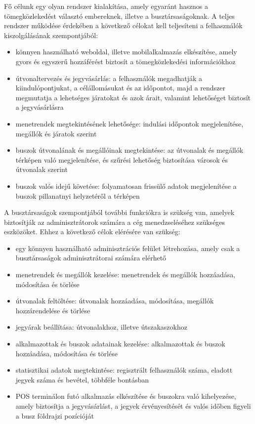 Fő célunk egy olyan rendszer kialakítása, amely egyaránt hasznos a tömegközlekedést választó embereknek, illetve a busztársaságoknak. A teljes rendszer működése érdekében a következő célokat kell teljesíteni a felhasználók kiszolgálásának szempontjából:

\begin{itemize}
  \item könnyen használható weboldal, illetve mobilalkalmazás elkészítése, amely gyors és egyszerű hozzáférést biztosít a tömegközlekedési információkhoz
  \item útvonaltervezés és jegyvásárlás: a felhasználók megadhatják a kiindulópontjukat, a célállomásukat és az időpontot, majd a rendszer megmutatja a lehetséges járatokat és azok árait, valamint lehetőséget biztosít a jegyvásárlásra
  \item menetrendek megtekintésének lehetősége: indulási időpontok megjelenítése, megállók és járatok szerint
  \item buszok útvonalának és megállóinak megtekintése: az útvonalak és megállók térképen való megjelenítése, és szűrési lehetőség biztosítása városok és útvonalak szerint
  \item buszok valós idejű követése: folyamatosan frissülő adatok megjelenítése a buszok pillanatnyi helyzetéről a térképen
\end{itemize}

A busztársaságok szempontjából további funkciókra is szükség van, amelyek biztosítják az adminisztrátorok számára a cég menedzseléséhez szükséges eszközöket. Ehhez a következő célok elérésére van szükség:

\begin{itemize}
  \item egy könnyen használható adminisztrációs felület létrehozása, amely csak a busztársaságok adminisztrátorai számára elérhető
  \item menetrendek és megállók kezelése: menetrendek és megállók hozzáadása, módosítása és törlése
  \item útvonalak feltöltése: útvonalak hozzáadása, módosítása, megállók hozzárendelése és törlése
  \item jegyárak beállítása: útvonalakhoz, illetve útszakaszokhoz
  \item alkalmazottak és buszok adatainak kezelése: alkalmazottak és buszok hozzáadása, módosítása és törlése
  \item statisztikai adatok megtekintése: regisztrált felhasználók száma, eladott jegyek száma és bevétel, többféle bontásban
  \item POS terminálon futó alkalmazás elkészítése és buszokra való kihelyezése, amely biztosítja a jegyvásárlást, a jegyek érvényesítését és valós időben figyeli a busz földrajzi pozícióját
\end{itemize}
